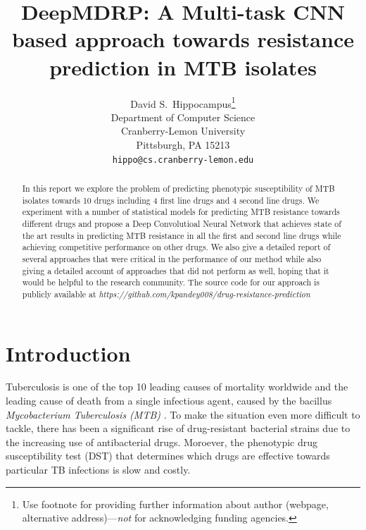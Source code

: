 \documentclass{article}
\title{DeepMDRP: A Multi-task CNN based approach towards resistance prediction in MTB isolates}
\author{%
  David S.~Hippocampus\thanks{Use footnote for providing further information
    about author (webpage, alternative address)---\emph{not} for acknowledging
    funding agencies.} \\
  Department of Computer Science\\
  Cranberry-Lemon University\\
  Pittsburgh, PA 15213 \\
  \texttt{hippo@cs.cranberry-lemon.edu} \\
}
\begin{document}
\maketitle

\begin{abstract}
  In this report we explore the problem of predicting phenotypic susceptibility of MTB isolates
towards 10 drugs including 4 first line drugs and 4 second line drugs. We experiment with a number
of statistical models for predicting MTB resistance towards different drugs and propose a Deep Convolutioal
Neural Network that achieves state of the art results in predicting MTB resistance in all the first and
second line drugs while achieving competitive performance on other drugs. We also give a detailed report
of several approaches that were critical in the performance of our method while also giving a detailed account
of approaches that did not perform as well, hoping that it would be helpful to the research community. The source
code for our approach is publicly available at \emph{https://github.com/kpandey008/drug-resistance-prediction}
\end{abstract}

\section{Introduction}

Tuberculosis is one of the top 10 leading causes of mortality worldwide and the leading cause
of death from a single infectious agent, caused by the bacillus \emph{Mycobacterium Tuberculosis (MTB)}
\cite{10665-329368}. To make the situation even more difficult to tackle, there has been a significant rise of
drug-resistant bacterial strains due to the increasing use of antibacterial drugs. Moroever, the phenotypic
drug susceptibility test (DST) that determines which drugs are effective towards particular TB infections
is slow and costly.
\end{document}
